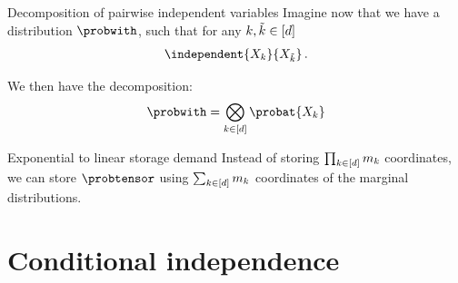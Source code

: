 \documentclass{beamer}
\begin{document}
    \begin{frame}{Decomposition of pairwise independent variables}
        Imagine now that we have a distribution $\probwith$, such that for any $k,\tilde{k}\in[d]$
        \begin{align*}
            \independent{\catvariableof{\catenumerator}}{\catvariableof{\seccatenumerator}} \, .
        \end{align*}

        We then have the decomposition:
        \begin{align*}
            \probwith = \bigotimes_{\catenumeratorin} \probat{\catvariableof{\catenumerator}}
        \end{align*}



        \begin{block}{Exponential to linear storage demand}
            Instead of storing $\prod_{k\in[d]}m_{k}$ coordinates, we can store $\probtensor$ using $\sum_{k\in[d]}m_{k}$ coordinates of the marginal distributions.
        \end{block}

    \end{frame}


    \section{Conditional independence}
\end{document}
